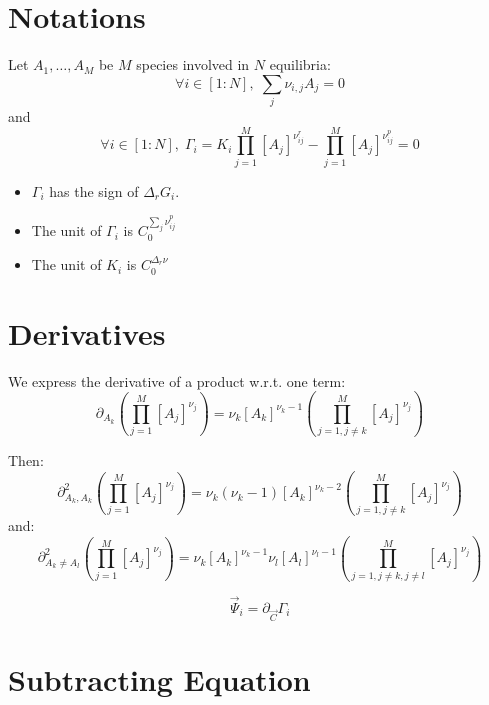 \documentclass[aps,12pt]{revtex4}
\begin{document}
\section{Notations}

Let $A_1,\ldots,A_M$ be $M$ species involved in $N$ equilibria:
\begin{equation}
	\forall i\in[1:N], \; \sum_j \nu_{i,j} A_j = 0
\end{equation}
and
\begin{equation}
	\forall i\in[1:N], \; 
	\Gamma_i = K_i \prod_{j=1}^{M} [A_j]^{\nu^r_{ij}} 
	- \prod_{j=1}^{M} [A_j]^{\nu^p_{ij}} = 0
\end{equation}

\begin{itemize}
\item $\Gamma_i$ has the sign of $\Delta_r G_i$.
\item The unit of $\Gamma_i$ is $C_0^{\sum_j \nu^p_{ij} }$
\item The unit of $K_i$ is $C_0^{\Delta_r \nu}$
\end{itemize}


\section{Derivatives}
We express the derivative of a product w.r.t. one term:
\begin{equation}
	\partial_{A_k} \left( \prod_{j=1}^{M} [A_j]^{\nu_{j}} \right)  =
	\nu_k [A_k]^{\nu_k-1} \left( \prod_{j=1,j\not=k}^{M} [A_j]^{\nu_{j}} \right)
\end{equation}

Then:
\begin{equation}
	\partial^2_{A_k, A_k} \left( \prod_{j=1}^{M} [A_j]^{\nu_{j}} \right)  =
	\nu_k (\nu_k-1) [A_k]^{\nu_k-2} \left( \prod_{j=1,j\not=k}^{M} [A_j]^{\nu_{j}} \right)
\end{equation}
and:
\begin{equation}
	\partial^2_{A_k\not=A_l} \left( \prod_{j=1}^{M} [A_j]^{\nu_{j}} \right)  =
	\nu_k [A_k]^{\nu_k-1} \nu_l [A_l]^{\nu_l-1}\left( \prod_{j=1,j\not=k,j\not=l}^{M} [A_j]^{\nu_{j}} \right)
\end{equation}

\begin{equation}
	\vec{\Psi}_i = \partial_{\vec{C}} \Gamma_i
\end{equation}

\section{Subtracting Equation}
\end{document}
